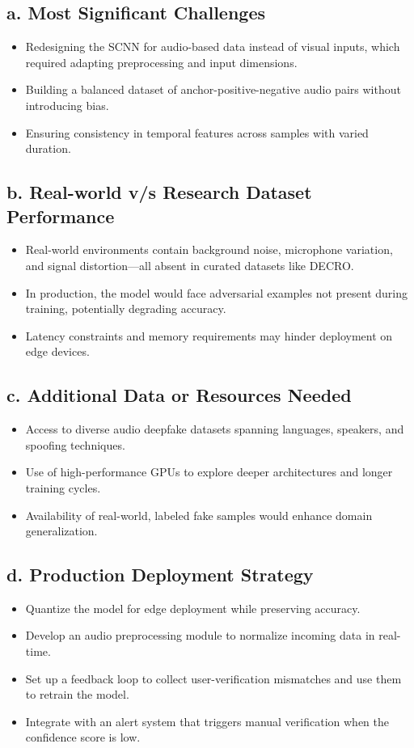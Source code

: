 \documentclass{article}
\begin{document}
\subsection*{a. Most Significant Challenges}
\begin{itemize}
\item Redesigning the SCNN for audio-based data instead of visual inputs, which required adapting preprocessing and input dimensions.
\item Building a balanced dataset of anchor-positive-negative audio pairs without introducing bias.
\item Ensuring consistency in temporal features across samples with varied duration.
\end{itemize}

\subsection*{b. Real-world v/s Research Dataset Performance}
\begin{itemize}
\item Real-world environments contain background noise, microphone variation, and signal distortion—all absent in curated datasets like DECRO.
\item In production, the model would face adversarial examples not present during training, potentially degrading accuracy.
\item Latency constraints and memory requirements may hinder deployment on edge devices.
\end{itemize}

\subsection*{c. Additional Data or Resources Needed}
\begin{itemize}
\item Access to diverse audio deepfake datasets spanning languages, speakers, and spoofing techniques.
\item Use of high-performance GPUs to explore deeper architectures and longer training cycles.
\item Availability of real-world, labeled fake samples would enhance domain generalization.
\end{itemize}

\subsection*{d. Production Deployment Strategy}
\begin{itemize}
\item Quantize the model for edge deployment while preserving accuracy.
\item Develop an audio preprocessing module to normalize incoming data in real-time.
\item Set up a feedback loop to collect user-verification mismatches and use them to retrain the model.
\item Integrate with an alert system that triggers manual verification when the confidence score is low.
\end{itemize}
\end{document}
